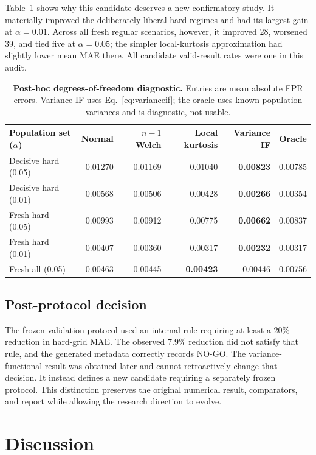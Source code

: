 \documentclass[10pt,twocolumn]{article}
\begin{document}
Table~\ref{tab:postaudit} shows why this candidate deserves a new
confirmatory study. It materially improved the deliberately liberal hard
regimes and had its largest gain at \(\alpha=0.01\). Across all fresh regular
scenarios, however, it improved 28, worsened 39, and tied five at
\(\alpha=0.05\); the simpler local-kurtosis approximation had slightly lower
mean MAE there. All candidate valid-result rates were one in this audit.

\begin{table}[t]
\centering
\caption{\textbf{Post-hoc degrees-of-freedom diagnostic.} Entries are mean
absolute FPR errors. Variance IF uses Eq.~\eqref{eq:varianceif}; the oracle
uses known population variances and is diagnostic, not usable.}
\label{tab:postaudit}
\small
\begin{tabular}{@{}lrrrrr@{}}
\toprule
Population set (\(\alpha\)) & Normal & \(n-1\) Welch & Local kurtosis &
Variance IF & Oracle\\
\midrule
Decisive hard (0.05) & 0.01270 & 0.01169 & 0.01040 & \textbf{0.00823} & 0.00785\\
Decisive hard (0.01) & 0.00568 & 0.00506 & 0.00428 & \textbf{0.00266} & 0.00354\\
Fresh hard (0.05) & 0.00993 & 0.00912 & 0.00775 & \textbf{0.00662} & 0.00837\\
Fresh hard (0.01) & 0.00407 & 0.00360 & 0.00317 & \textbf{0.00232} & 0.00317\\
Fresh all (0.05) & 0.00463 & 0.00445 & \textbf{0.00423} & 0.00446 & 0.00756\\
\bottomrule
\end{tabular}
\end{table}

\subsection{Post-protocol decision}

The frozen validation protocol used an internal rule requiring at least a
20\% reduction in hard-grid MAE. The observed 7.9\% reduction did not satisfy
that rule, and the generated metadata correctly records NO-GO. The
variance-functional result was obtained later and cannot retroactively change
that decision. It instead defines a new candidate requiring a separately
frozen protocol. This distinction preserves the original numerical result,
comparators, and report while allowing the research direction to evolve.

\section{Discussion}
\end{document}
